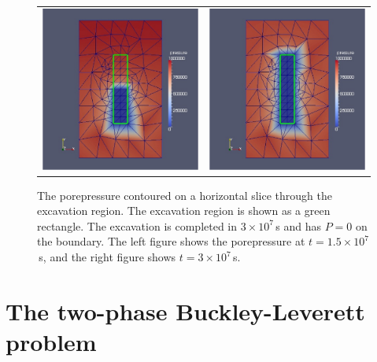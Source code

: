 \documentclass[]{scrreprt}
\begin{document}
\begin{figure}[htb]
\centering
\begin{tabular}{cc}
\includegraphics[width=8cm]{ex02_1.5.eps} &
\includegraphics[width=8cm]{ex02_3.eps}
\end{tabular}
\caption{The porepressure contoured on a horizontal slice through the
  excavation region.  The excavation region is shown as a green
  rectangle.  The excavation is completed in $3\times 10^{7}$\,s and
  has $P=0$ on the boundary.  The left figure shows the porepressure
  at $t=1.5\times 10^{7}$\,s, and the right figure shows $t=3\times
  10^{7}$\,s.}
\label{ex02.fig}
\end{figure}




\chapter{The two-phase Buckley-Leverett problem}
\label{bl2}
\end{document}
